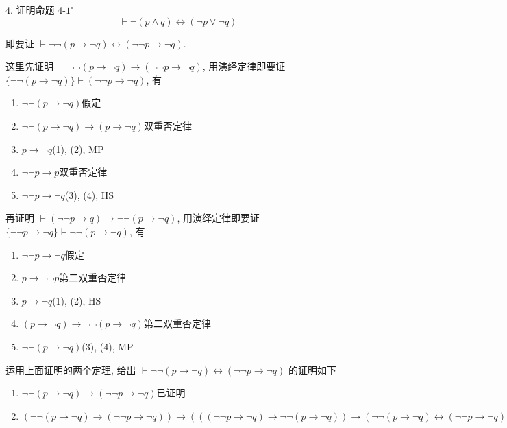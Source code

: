 \documentclass[boxes]{homework}
\begin{document}
\begin{problem}
    4. 证明命题 4-$1^\circ$
    $$
    \vdash \lnot (p\land q) \leftrightarrow (\lnot p\lor \lnot q)
    $$
\end{problem}

\begin{solution}
    即要证 $\vdash \lnot\lnot (p\to \lnot q)\leftrightarrow(\lnot\lnot p\to\lnot q)$.
    
    这里先证明 $\vdash \lnot\lnot (p\to \lnot q)\to(\lnot\lnot p\to\lnot q)$, 用演绎定律即要证 $\{\lnot\lnot(p\to\lnot q)\}\vdash (\lnot\lnot p\to\lnot q)$, 有
    \begin{enumerate}[label = (\arabic*), itemsep = 0em, topsep = .5em, partopsep = .5em]
        \item $\lnot\lnot (p\to \lnot q)$\hfill 假定
        \item $\lnot\lnot (p\to \lnot q)\to (p\to\lnot q)$\hfill 双重否定律
        \item $p\to\lnot q$\hfill (1), (2), MP
        \item $\lnot\lnot p\to p$\hfill 双重否定律
        \item $\lnot\lnot p\to\lnot q$\hfill (3), (4), HS
    \end{enumerate}

    再证明 $\vdash (\lnot\lnot p\to q)\to\lnot\lnot (p\to\lnot q)$, 用演绎定律即要证 $\{\lnot\lnot p\to\lnot q\}\vdash \lnot\lnot (p\to\lnot q)$, 有
    \begin{enumerate}[label = (\arabic*), itemsep = 0em, topsep = .5em, partopsep = .5em]
        \item $\lnot\lnot p\to\lnot q$\hfill 假定
        \item $p\to\lnot\lnot p$\hfill 第二双重否定律
        \item $p\to\lnot q$\hfill (1), (2), HS
        \item $(p\to\lnot q)\to\lnot\lnot (p\to\lnot q)$\hfill 第二双重否定律
        \item $\lnot\lnot (p\to\lnot q)$\hfill (3), (4), MP
    \end{enumerate}
    
    运用上面证明的两个定理, 给出 $\vdash \lnot\lnot (p\to \lnot q)\leftrightarrow(\lnot\lnot p\to\lnot q)$ 的证明如下
    \begin{enumerate}[label = (\arabic*), itemsep = 0em, topsep = .5em, partopsep = .5em]
        \item $\lnot\lnot (p\to \lnot q)\to(\lnot\lnot p\to\lnot q)$\hfill 已证明
        \item $(\lnot\lnot (p\to \lnot q)\to(\lnot\lnot p\to\lnot q))\to (((\lnot\lnot p\to\lnot q)\to \lnot\lnot (p\to \lnot q))\to (\lnot\lnot (p\to \lnot q)\leftrightarrow(\lnot\lnot p\to\lnot q)))$
        

\end{enumerate}
\end{solution}
\end{document}
